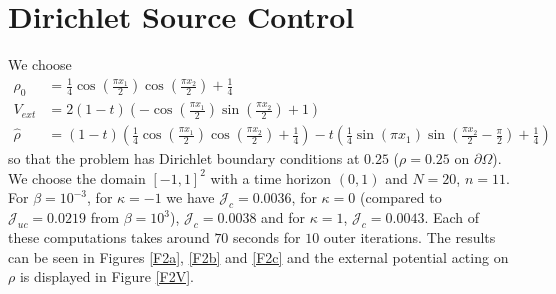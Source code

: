 \documentclass[11pt, a4paper]{article}
\theoremstyle{definition}
\newcommand{\hr}{\widehat \rho}
\begin{document}
	\section{Dirichlet Source Control}
	We choose 
	\begin{align*}
		\rho_0 &= \frac{1}{4}\cos\left(\frac{\pi x_1}{2}\right)\cos\left(\frac{\pi x_2}{2}\right) + \frac{1}{4}\\
		V_{ext} &=  2(1-t)\left(-\cos\left(\frac{\pi x_1}{2}\right)\sin\left(\frac{\pi x_2}{2}\right) + 1\right)\\
		\hr &= (1 - t)\left(\frac{1}{4}\cos\left(\frac{\pi x_1}{2}\right)\cos\left(\frac{\pi x_2}{2}\right) + \frac{1}{4}\right) - t\left(\frac{1}{4}\sin\left(\pi x_1\right)\sin\left(\frac{\pi x_2}{2} - \frac{\pi}{2}\right) + \frac{1}{4}\right)
	\end{align*}
	so that the problem has Dirichlet boundary conditions at $0.25$ ($\rho = 0.25$ on $\partial \Omega$).
	We choose the domain $[-1,1]^2$ with a time horizon $(0,1)$ and $N = 20$, $n = 11$.
	For $\beta = 10^{-3}$, for $\kappa = -1$ we have $\mathcal J_c = 0.0036$, for $\kappa = 0$ (compared to $\mathcal J_{uc} = 0.0219$ from $\beta = 10^3$), $\mathcal J_c = 0.0038$ and for $\kappa = 1$, $\mathcal J_c = 0.0043$. Each of these computations takes around $70$ seconds for $10$ outer iterations. The results can be seen in Figures \ref{F2a}, \ref{F2b} and \ref{F2c} and the external potential acting on $\rho$ is displayed in Figure \ref{F2V}.\\
	
\end{document}
